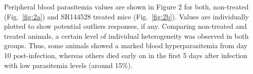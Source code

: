 \documentclass[empirical, authordate]{jote-new-article}
\begin{document}
Peripheral blood parasitemia values are shown in Figure 2 for both, non-treated (Fig.~\ref{fig:2a}) and SR144528 treated mice (Fig.~\ref{fig:2b}). Values are individually plotted to show potential outliers responses, if any. Comparing non-treated and treated animals, a certain level of individual heterogeneity was observed in both groups. Thus, some animals showed a marked blood hyperparasitemia from day 10 post-infection, whereas others died early on in the first 5 days after infection with low parasitemia levels (around 15\%).

\begin{figure}[h!]
  \begin{fullwidth}
    \raggedright
    \caption{}
    \label{fig:3}
  \end{fullwidth}
\end{figure}
\end{document}
